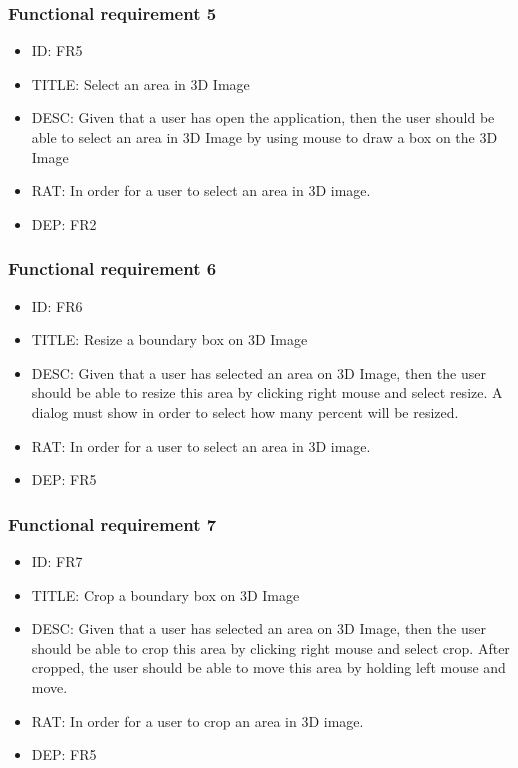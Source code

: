 \documentclass[11pt]{article}
\begin{document}
\subsubsection{Functional requirement 5}
\begin{itemize}
\item ID: FR5
\item TITLE: Select an area in 3D Image
\item DESC: Given that a user has open the application, then the user should be able to select an area in 3D Image by using mouse to draw a box on the 3D Image
\item RAT: In order for a user to select an area in 3D image.
\item DEP: FR2
\end{itemize}
\subsubsection{Functional requirement 6}
\begin{itemize}
\item ID: FR6
\item TITLE: Resize a boundary box on 3D Image
\item DESC: Given that a user has selected an area on 3D Image, then the user should be able to resize this area by clicking right mouse and select resize. A dialog must show in order to select how many percent will be resized.
\item RAT: In order for a user to select an area in 3D image.
\item DEP: FR5
\end{itemize}
\subsubsection{Functional requirement 7}
\begin{itemize}
\item ID: FR7
\item TITLE: Crop a boundary box on 3D Image
\item DESC: Given that a user has selected an area on 3D Image, then the user should be able to crop this area by clicking right mouse and select crop. After cropped, the user should be able to move this area by holding left mouse and move.
\item RAT: In order for a user to crop an area in 3D image.
\item DEP: FR5
\end{itemize}
\end{document}
